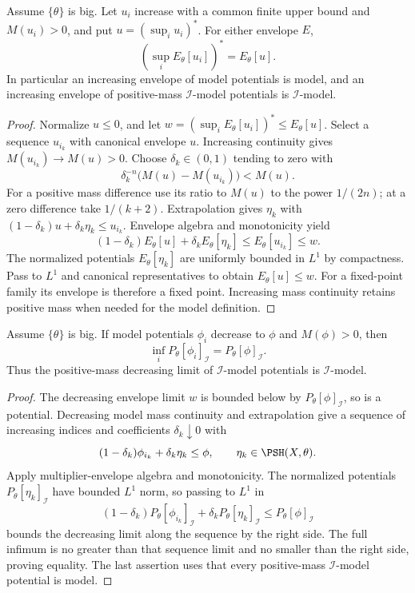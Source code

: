 \begin{proposition}\label{prop:increasing-two-envelope-continuity}
Assume $\{\theta\}$ is big. Let $u_i$ increase with a common finite upper bound and $M(u_i)>0$, and put $u=(\sup_i u_i)^*$. For either envelope $E$,
\[
 (\sup_iE_\theta[u_i])^*=E_\theta[u].
\]
In particular an increasing envelope of model potentials is model, and an increasing envelope of positive-mass $\mathcal I$-model potentials is $\mathcal I$-model.
\end{proposition}
\begin{proof}
Normalize $u\leq0$, and let $w=(\sup_iE_\theta[u_i])^*\leq E_\theta[u]$. Select a sequence $u_{i_k}$ with canonical envelope $u$. Increasing continuity gives $M(u_{i_k})\to M(u)>0$. Choose $\delta_k\in(0,1)$ tending to zero with
\[
 \delta_k^{-n}\bigl(M(u)-M(u_{i_k})\bigr)<M(u).
\]
For a positive mass difference use its ratio to $M(u)$ to the power $1/(2n)$; at a zero difference take $1/(k+2)$. Extrapolation gives $\eta_k$ with $(1-\delta_k)u+\delta_k\eta_k\leq u_{i_k}$. Envelope algebra and monotonicity yield
\[
 (1-\delta_k)E_\theta[u]+\delta_k E_\theta[\eta_k]
                                  \leq E_\theta[u_{i_k}]\leq w.
\]
The normalized potentials $E_\theta[\eta_k]$ are uniformly bounded in $L^1$ by compactness. Pass to $L^1$ and canonical representatives to obtain $E_\theta[u]\leq w$. For a fixed-point family its envelope is therefore a fixed point. Increasing mass continuity retains positive mass when needed for the model definition.
\end{proof}

\begin{proposition}\label{prop:decreasing-model-multiplier-continuity}
Assume $\{\theta\}$ is big. If model potentials $\phi_i$ decrease to $\phi$ and $M(\phi)>0$, then
\[
 \inf_iP_\theta[\phi_i]_{\mathcal I}=P_\theta[\phi]_{\mathcal I}.
\]
Thus the positive-mass decreasing limit of $\mathcal I$-model potentials is $\mathcal I$-model.
\end{proposition}
\begin{proof}
The decreasing envelope limit $w$ is bounded below by $P_\theta[\phi]_{\mathcal I}$, so is a potential. Decreasing model mass continuity and extrapolation give a sequence of increasing indices and coefficients $\delta_k\downarrow0$ with
\[
 (1-\delta_k)\phi_{i_k}+\delta_k\eta_k\leq\phi,
              \qquad \eta_k\in\PSH(X,\theta).
\]
Apply multiplier-envelope algebra and monotonicity. The normalized potentials $P_\theta[\eta_k]_{\mathcal I}$ have bounded $L^1$ norm, so passing to $L^1$ in
\[
 (1-\delta_k)P_\theta[\phi_{i_k}]_{\mathcal I}
       +\delta_kP_\theta[\eta_k]_{\mathcal I}
                        \leq P_\theta[\phi]_{\mathcal I}
\]
bounds the decreasing limit along the sequence by the right side. The full infimum is no greater than that sequence limit and no smaller than the right side, proving equality. The last assertion uses that every positive-mass $\mathcal I$-model potential is model.
\end{proof}

